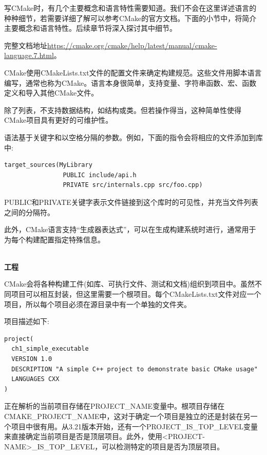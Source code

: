
写CMake时，有几个主要概念和语言特性需要知道。我们不会在这里详述语言的种种细节，若需要详细了解可以参考CMake的官方文档。下面的小节中，将简介主要概念和语言特性。后续章节将深入探讨其中细节。

完整文档地址\url{https://cmake.org/cmake/help/latest/manual/cmake-language.7.html}。


CMake使用CMakeLists.txt文件的配置文件来确定构建规范。这些文件用脚本语言编写，通常也称为CMake。语言本身很简单，支持变量、字符串函数、宏、函数定义和导入其他CMake文件。

除了列表，不支持数据结构，如结构或类。但若操作得当，这种简单性使得CMake项目具有更好的可维护性。

语法基于关键字和以空格分隔的参数。例如，下面的指令会将相应的文件添加到库中:

\begin{lstlisting}[style=styleCMake]
target_sources(MyLibrary
                PUBLIC include/api.h
                PRIVATE src/internals.cpp src/foo.cpp)
\end{lstlisting}

PUBLIC和PRIVATE关键字表示文件链接到这个库时的可见性，并充当文件列表之间的分隔符。

此外，CMake语言支持“生成器表达式”，可以在生成构建系统时进行，通常用于为每个构建配置指定特殊信息。

\hspace*{\fill} \\ %
\noindent
\textbf{工程}

CMake会将各种构建工件(如库、可执行文件、测试和文档)组织到项目中。虽然不同项目可以相互封装，但这里需要一个根项目。每个CMakeLists.txt文件对应一个项目，所以每个项目必须在源目录中有一个单独的文件夹。

项目描述如下:

\begin{lstlisting}[style=styleCMake]
project(
  ch1_simple_executable
  VERSION 1.0
  DESCRIPTION "A simple C++ project to demonstrate basic CMake usage"
  LANGUAGES CXX
)
\end{lstlisting}

正在解析的当前项目存储在PROJECT\_NAME变量中。根项目存储在CMAKE\_PROJECT\_NAME中，这对于确定一个项目是独立的还是封装在另一个项目中很有用。从3.21版本开始，还有一个PROJECT\_IS\_TOP\_LEVEL变量来直接确定当前项目是否是顶层项目。此外，使用<PROJECT-NAME>\_IS\_TOP\_LEVEL，可以检测特定的项目是否为顶层项目。

